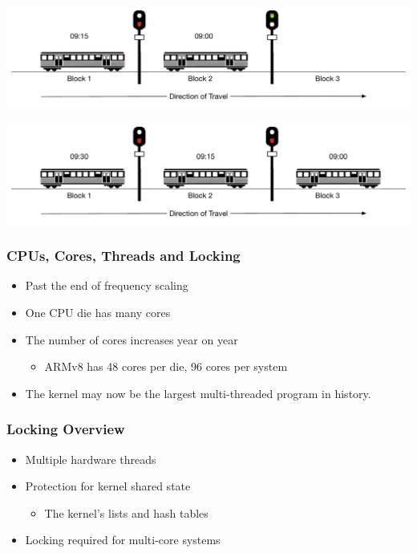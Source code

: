 \documentclass[pdftex]{beamer} %
\begin{document}
\begin{frame}
      \includegraphics[width=\textwidth]{../../figures/block-signaling-2.pdf}
\end{frame}

\begin{frame}
      \includegraphics[width=\textwidth]{../../figures/block-signaling-3.pdf}
\end{frame}

\begin{frame}
  \frametitle{CPUs, Cores, Threads and Locking}
  \begin{itemize}
  \item Past the end of frequency scaling
  \item One CPU die has many cores
  \item The number of cores increases year on year
    \begin{itemize}
    \item ARMv8 has 48 cores per die, 96 cores per system
    \end{itemize}
  \item The kernel may now be the largest multi-threaded program in history.
  \end{itemize}
\end{frame}

\begin{frame}
  \frametitle{Locking Overview}
  \begin{itemize}
  \item Multiple hardware threads
  \item Protection for kernel shared state
    \begin{itemize}
    \item The kernel's lists and hash tables
    \end{itemize}
  \item Locking required for multi-core systems
  \end{itemize}
\end{frame}
\end{document}
